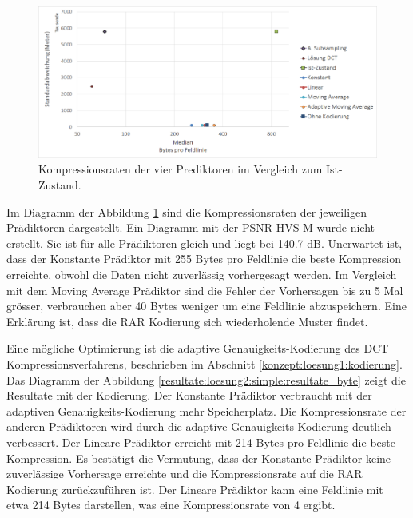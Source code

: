 \begin{figure}[!htbp]
	\center
	\includegraphics[width=1\textwidth,keepaspectratio]{./pictures/resultate/loesung2/variante0/resultate.png}
	\caption{Kompressionsraten der vier Prediktoren im Vergleich zum Ist-Zustand.}
	\label{resultate:loesung2:simple:resultate}
\end{figure}
Im Diagramm der Abbildung \ref{resultate:loesung2:simple:resultate} sind die Kompressionsraten der jeweiligen Prädiktoren dargestellt. Ein Diagramm mit der PSNR-HVS-M wurde nicht erstellt. Sie ist für alle Prädiktoren gleich und liegt bei 140.7 dB. Unerwartet ist, dass der Konstante Prädiktor mit 255 Bytes pro Feldlinie die beste Kompression erreichte, obwohl die Daten nicht zuverlässig vorhergesagt werden. Im Vergleich mit dem Moving Average Prädiktor sind die Fehler der Vorhersagen 
bis zu 5 Mal grösser, verbrauchen aber 40 Bytes weniger um eine Feldlinie abzuspeichern. Eine Erklärung ist, dass die RAR Kodierung sich wiederholende Muster findet.

Eine mögliche Optimierung ist die adaptive Genauigkeits-Kodierung des DCT Kompressionsverfahrens, beschrieben im Abschnitt \ref{konzept:loesung1:kodierung}. Das Diagramm der Abbildung \ref{resultate:loesung2:simple:resultate_byte} zeigt die Resultate mit der Kodierung. Der Konstante Prädiktor verbraucht mit der adaptiven Genauigkeits-Kodierung mehr Speicherplatz. Die Kompressionsrate der anderen Prädiktoren wird durch die adaptive Genauigkeits-Kodierung deutlich verbessert. Der Lineare Prädiktor erreicht mit 214 Bytes pro Feldlinie die beste Kompression. Es bestätigt die Vermutung, dass der Konstante Prädiktor keine zuverlässige Vorhersage erreichte und die Kompressionsrate auf die RAR Kodierung zurückzuführen ist. Der Lineare Prädiktor kann eine Feldlinie mit etwa 214 Bytes darstellen, was eine Kompressionsrate von 4 ergibt.

